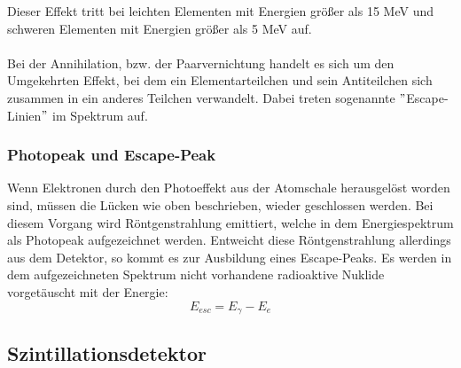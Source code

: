 Dieser Effekt tritt bei leichten Elementen mit Energien größer als 15 MeV und schweren Elementen mit Energien größer als 5 MeV auf.\\
\\
Bei der Annihilation, bzw. der Paarvernichtung handelt es sich um den Umgekehrten Effekt, bei dem ein Elementarteilchen und sein Antiteilchen sich zusammen in ein anderes Teilchen verwandelt. Dabei treten sogenannte $"$Escape-Linien$"$ im Spektrum auf. 

\subsubsection*{Photopeak und Escape-Peak}
Wenn Elektronen durch den Photoeffekt aus der Atomschale herausgelöst worden sind, müssen die Lücken wie oben beschrieben, wieder geschlossen werden. Bei diesem Vorgang wird Röntgenstrahlung emittiert, welche in dem Energiespektrum als Photopeak aufgezeichnet werden. Entweicht diese Röntgenstrahlung allerdings aus dem Detektor, so kommt es zur Ausbildung eines Escape-Peaks. Es werden in dem aufgezeichneten Spektrum nicht vorhandene radioaktive Nuklide vorgetäuscht mit der Energie:
	\begin{equation}
	E_{esc} = E_{\gamma} - E_{e}
	\end{equation}

\subsection{Szintillationsdetektor}